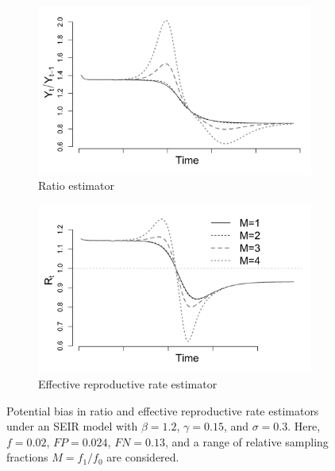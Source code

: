 \documentclass[11pt]{amsart}
\numberwithin{equation}{section}
\theoremstyle{plain}
\begin{document}
 \begin{figure}[!th]
 \centering
 \begin{subfigure}{.5\textwidth}
  \centering
  \includegraphics[width=.9\linewidth]{../figs/seir_ratio.png}
  \caption{Ratio estimator}
  \label{fig:ratio-bias}
 \end{subfigure}%
 \begin{subfigure}{.5\textwidth}
  \centering
  \includegraphics[width=.9\linewidth]{../figs/seir_rt.png}
  \caption{Effective reproductive rate estimator}
  \label{fig:r0-bias}
 \end{subfigure}
 \caption{Potential bias in ratio and effective reproductive rate estimators under an SEIR model with $\beta = 1.2$, $\gamma = 0.15$, and $\sigma = 0.3$.  Here, $f = 0.02$, $FP = 0.024$, $FN = 0.13$, and a range of relative sampling fractions $M = f_1/f_0$ are considered.}
 \label{fig:rates}
 \end{figure}
\end{document}
